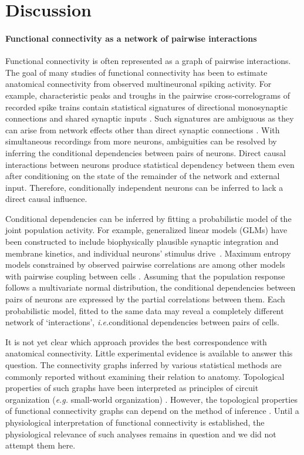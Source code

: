 \documentclass[10pt]{article}
\newcommand{\sq}[1]{\lq#1\rq}
\newcommand{\ie}{\emph{i.e.}\;}
\begin{document}
\section*{Discussion}
\paragraph{Functional connectivity as a network of pairwise interactions}
Functional connectivity is often represented as a graph of pairwise interactions. The goal of many studies of functional connectivity has been to estimate  anatomical connectivity from  observed multineuronal spiking activity.  For example, characteristic peaks and troughs in the pairwise cross-correlograms of recorded spike trains contain statistical signatures of directional monosynaptic connections and shared synaptic inputs \cite{Gerstein:1964, Perkel:1967, Moore:1970, Alonso:1998, Denman:2013}.  Such signatures are ambiguous as they can arise from network effects other than direct synaptic connections \cite{Aertsen:1989}.  With simultaneous recordings from more neurons, ambiguities can be resolved by inferring the conditional dependencies between pairs of neurons.  Direct causal interactions between neurons produce statistical dependency between them even after conditioning on the state of the remainder of the network and external input. Therefore, conditionally independent neurons can be inferred to lack a direct causal influence.  

Conditional dependencies can be inferred by fitting a probabilistic model of the joint population activity. For example, generalized linear models (GLMs) have been constructed to  include biophysically plausible synaptic integration and membrane kinetics, and individual neurons' stimulus drive~\cite{Pillow:2008}.  Maximum entropy models constrained by observed pairwise correlations are among other models with pairwise coupling between cells \cite{Schneidman:2006, Tkacik:2006, Yu:2008, Tang:2008, Shlens:2009}.  Assuming that the population response follows a multivariate normal distribution, the conditional dependencies between pairs of neurons are expressed by the partial correlations between them.   Each probabilistic model, fitted to the same data may reveal a completely different network of \sq{interactions},  \ie conditional dependencies between pairs of cells. 

It is not yet clear which approach provides the best correspondence with anatomical connectivity. Little experimental evidence is available to answer this question.  The connectivity graphs inferred by various statistical methods are commonly reported without examining their relation to anatomy.  
Topological properties of such graphs have been interpreted as principles of circuit organization (\emph{e.g.} small-world organization) \cite{Feldt:2011, Yu:2008, Malmersjo:2013, Sadovsky:2014}.  However, the topological properties of functional connectivity graphs can depend on the method of inference \cite{Zalesky:2012}. Until a physiological interpretation of functional connectivity is established, the physiological relevance of such analyses remains in question and we did not attempt them here.
\end{document}
